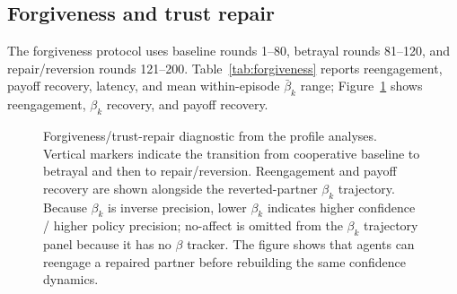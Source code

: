 \subsection{Forgiveness and trust repair}

The forgiveness protocol uses baseline rounds 1--80, betrayal rounds 81--120, and repair/reversion rounds 121--200. Table~\ref{tab:forgiveness} reports reengagement, payoff recovery, latency, and mean within-episode $\bar{\beta}_k$ range; Figure~\ref{fig:forgiveness_appendix} shows reengagement, $\beta_k$ recovery, and payoff recovery.

\begin{table}[H]
\centering
\caption{Forgiveness and trust-repair metrics by precision profile. Reengagement is the post-repair P0 selection rate; payoff recovery compares late post-repair payoff with the late pre-betrayal baseline.}
\label{tab:forgiveness}
\end{table}

\begin{figure}[H]
\centering
{}
\caption{Forgiveness/trust-repair diagnostic from the profile analyses. Vertical markers indicate the transition from cooperative baseline to betrayal and then to repair/reversion. Reengagement and payoff recovery are shown alongside the reverted-partner $\beta_k$ trajectory. Because $\beta_k$ is inverse precision, lower $\beta_k$ indicates higher confidence / higher policy precision; no-affect is omitted from the $\beta_k$ trajectory panel because it has no $\beta$ tracker. The figure shows that agents can reengage a repaired partner before rebuilding the same confidence dynamics.}
\label{fig:forgiveness_appendix}
\end{figure}
